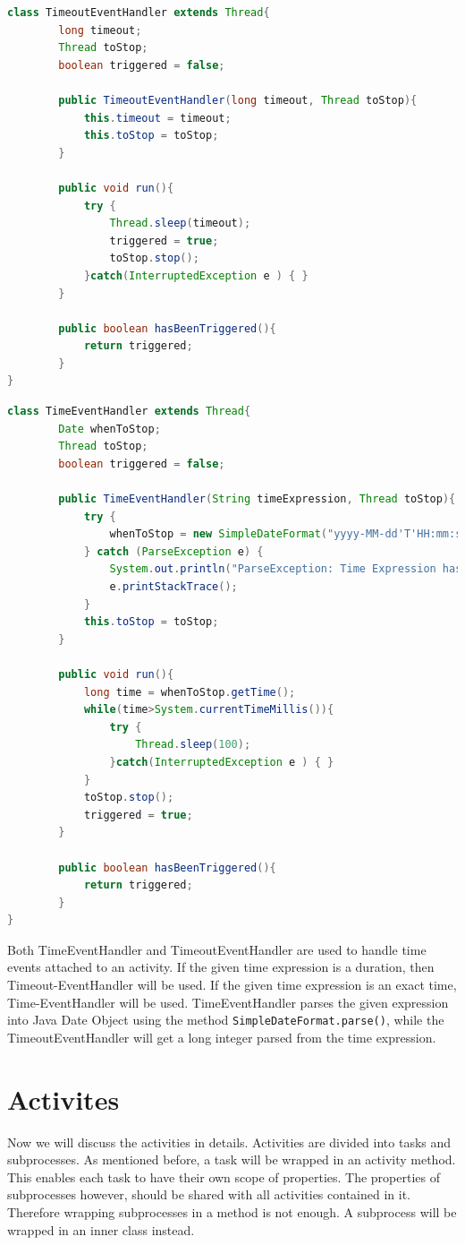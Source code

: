 \begin{lstlisting}[language=Java , caption=TimeoutEventHandler Implementation]
class TimeoutEventHandler extends Thread{
		long timeout;
		Thread toStop;
		boolean triggered = false;
		
		public TimeoutEventHandler(long timeout, Thread toStop){
			this.timeout = timeout;
			this.toStop = toStop;
		}
		
		public void run(){
			try {
				Thread.sleep(timeout);
				triggered = true;
				toStop.stop();
			}catch(InterruptedException e ) { }
		}
		
		public boolean hasBeenTriggered(){
			return triggered;
		}
}
\end{lstlisting}
\begin{lstlisting}[language=Java , caption=TimeEventHandler Implementation]
class TimeEventHandler extends Thread{
		Date whenToStop;
		Thread toStop;
		boolean triggered = false;
		
		public TimeEventHandler(String timeExpression, Thread toStop){
			try {
				whenToStop = new SimpleDateFormat("yyyy-MM-dd'T'HH:mm:ss.SSSZ").parse(timeExpression);
			} catch (ParseException e) {
				System.out.println("ParseException: Time Expression has to be in yyyy-MM-dd'T'HH:mm:ss.SSSZ format!");
				e.printStackTrace();
			} 
			this.toStop = toStop;
		}
		
		public void run(){
			long time = whenToStop.getTime();
			while(time>System.currentTimeMillis()){
				try {
					Thread.sleep(100);
				}catch(InterruptedException e ) { }
			}
			toStop.stop();
			triggered = true;
		}
		
		public boolean hasBeenTriggered(){
			return triggered;
		}
}
\end{lstlisting}

Both TimeEventHandler and TimeoutEventHandler are used to handle time events attached to an activity. If the given time expression is a duration, then Timeout-EventHandler will be used. If the given time expression is an exact time, Time-EventHandler will be used. TimeEventHandler parses the given expression into Java Date Object using the method \verb|SimpleDateFormat.parse()|, while the TimeoutEventHandler will get a long integer parsed from the time expression. 

\newpage
\section{Activites}
Now we will discuss the activities in details. Activities are divided into tasks and subprocesses. As mentioned before, a task will be wrapped in an activity method. This enables each task to have their own scope of properties. The properties of subprocesses however, should be shared with all activities contained in it. Therefore wrapping subprocesses in a method is not enough. A subprocess will be wrapped in an inner class instead.
 

